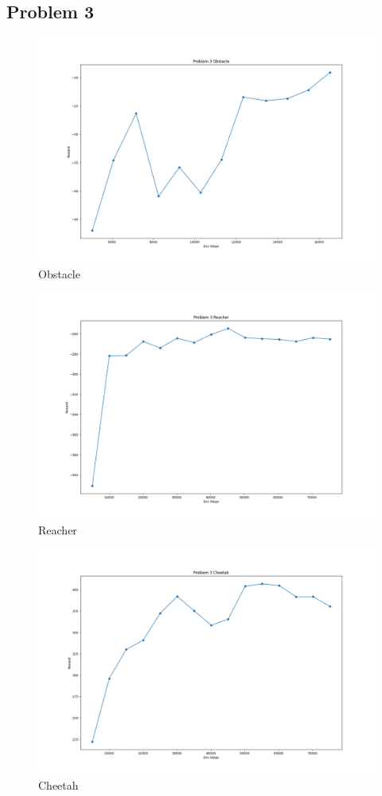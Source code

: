 \documentclass[10pt]{report}
\begin{document}
\subsection*{Problem 3}
\begin{figure}[h]
	\includegraphics[width=\textwidth]{figures/Problem 3/Problem 3 Obstacle.png}
	\caption{Obstacle}
\end{figure}
\newpage
\begin{figure}[h]
	\includegraphics[width=\textwidth]{figures/Problem 3/Problem 3 Reacher.png}
	\caption{Reacher}
\end{figure}
\newpage
\begin{figure}[h]
	\includegraphics[width=\textwidth]{figures/Problem 3/Problem 3 Cheetah.png}
	\caption{Cheetah}
\end{figure}
\end{document}
